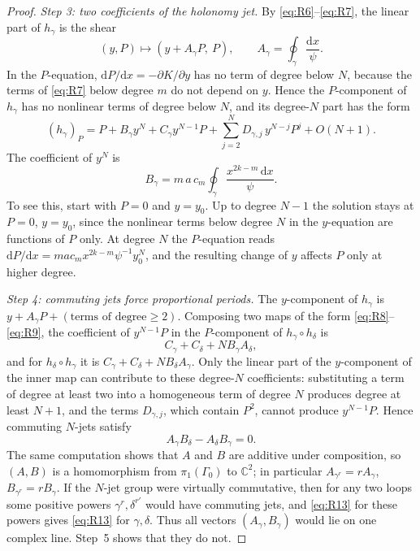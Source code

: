 \documentclass[11pt]{article}
\numberwithin{equation}{section}
\theoremstyle{definition}
\theoremstyle{remark}
\newcommand{\C}{\mathbb C}
\newcommand{\dd}{\mathrm d}
\begin{document}
\begin{proof}
\emph{Step 3: two coefficients of the holonomy jet.} By \eqref{eq:R6}--\eqref{eq:R7}, the linear part of $h_\gamma$ is
the shear
\begin{equation}\label{eq:R8}
(y,P)\mapsto(y+A_\gamma P,\ P),\qquad A_\gamma=\oint_\gamma\frac{\dd x}{\psi}.
\end{equation}
In the $P$-equation, $\dd P/\dd x=-\partial K/\partial y$ has no term of degree below $N$, because the terms of
\eqref{eq:R7} below degree $m$ do not depend on $y$. Hence the $P$-component of $h_\gamma$ has no nonlinear terms of
degree below $N$, and its degree-$N$ part has the form
\begin{equation}\label{eq:R9}
(h_\gamma)_P=P+B_\gamma y^N+C_\gamma y^{N-1}P+\sum_{j=2}^{N}D_{\gamma,j}\,y^{N-j}P^j+O(N+1).
\end{equation}
The coefficient of $y^N$ is
\begin{equation}\label{eq:R10}
B_\gamma=m\,a\,c_m\oint_\gamma\frac{x^{2k-m}\,\dd x}{\psi}.
\end{equation}
To see this, start with $P=0$ and $y=y_0$. Up to degree $N-1$ the solution stays at $P=0$, $y=y_0$, since the
nonlinear terms below degree $N$ in the $y$-equation are functions of $P$ only. At degree $N$ the $P$-equation reads
$\dd P/\dd x=m a c_m x^{2k-m}\psi^{-1}y_0^{N}$, and the resulting change of $y$ affects $P$ only at higher degree.

\emph{Step 4: commuting jets force proportional periods.} The $y$-component of $h_\gamma$ is
$y+A_\gamma P+(\text{terms of degree}\ge2)$. Composing two maps of the form \eqref{eq:R8}--\eqref{eq:R9}, the
coefficient of $y^{N-1}P$ in the $P$-component of $h_\gamma\circ h_\delta$ is
\begin{equation}\label{eq:R11}
C_\gamma+C_\delta+N B_\gamma A_\delta,
\end{equation}
and for $h_\delta\circ h_\gamma$ it is $C_\gamma+C_\delta+NB_\delta A_\gamma$. Only the linear part of the
$y$-component of the inner map can contribute to these degree-$N$ coefficients: substituting a term of degree at least
two into a homogeneous term of degree $N$ produces degree at least $N+1$, and the terms $D_{\gamma,j}$, which contain
$P^2$, cannot produce $y^{N-1}P$. Hence commuting $N$-jets satisfy
\begin{equation}\label{eq:R13}
A_\gamma B_\delta-A_\delta B_\gamma=0 .
\end{equation}
The same computation shows that $A$ and $B$ are additive under composition, so $(A,B)$ is a homomorphism from
$\pi_1(\Gamma_0)$ to $\C^2$; in particular $A_{\gamma^r}=rA_\gamma$, $B_{\gamma^r}=rB_\gamma$. If the $N$-jet group
were virtually commutative, then for any two loops some positive powers $\gamma^r,\delta^{r'}$ would have commuting
jets, and \eqref{eq:R13} for these powers gives \eqref{eq:R13} for $\gamma,\delta$. Thus all vectors
$(A_\gamma,B_\gamma)$ would lie on one complex line. Step~5 shows that they do not.


\end{proof}
\end{document}
